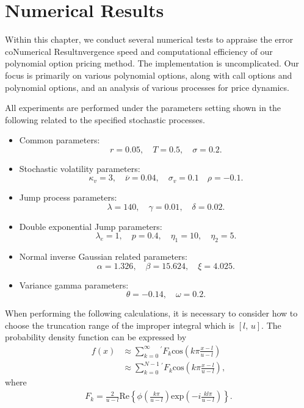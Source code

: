 
\chapter{Numerical Results}

Within this chapter, we conduct several numerical tests to appraise the error coNumerical Resultnvergence speed and computational efficiency of our polynomial option pricing method. The implementation is uncomplicated. Our focus is primarily on various polynomial options, along with call options and polynomial options, and an analysis of various processes for price dynamics. 

All experiments are performed under the parameters setting shown in the following related to the specified stochastic processes.
\begin{itemize}
    \item Common parameters: 
    $$r = 0.05, \quad T = 0.5, \quad \sigma = 0.2.$$
    \item Stochastic volatility parameters: 
    $$\kappa_v = 3, \quad \overline{\nu} = 0.04, \quad \sigma_v=0.1 \quad \rho = -0.1.$$
    \item Jump process parameters: 
    $$\lambda = 140, \quad \gamma = 0.01, \quad \delta = 0.02.$$
    \item Double exponential Jump parameters:
    $$\lambda_e = 1, \quad p = 0.4, \quad \eta_1 = 10, \quad \eta_2 = 5.$$  
    \item Normal inverse Gaussian related parameters:
    $$\alpha = 1.326, \quad \beta = 15.624, \quad \xi = 4.025.$$
    \item Variance gamma parameters:
    $$\theta = -0.14, \quad \omega = 0.2.$$
\end{itemize}

When performing the following calculations, it is necessary to consider how to choose the truncation range of the improper integral which is $\left[l, \, u\right]$. The probability density function can be expressed by 
\begin{align}
    f\left(x\right) &\approx \sum_{k=0}^{\infty}^{'} F_k \mathrm{cos}\left(k\pi \frac{x-l}{u-l}\right) \nonumber \\
    &\approx \sum_{k=0}^{N-1}^{'} F_k \mathrm{cos}\left(k\pi \frac{x-l}{u-l}\right), \label{density_ft}
\end{align}
where 
\begin{align*}
F_k = \frac{2}{u-l}\mathrm{Re}\left\{ \phi\left(\frac{k\pi}{u-l}\right) \mathrm{exp}\left(-i\frac{kl\pi}{u-l}\right) \right\}.
\end{align*}

